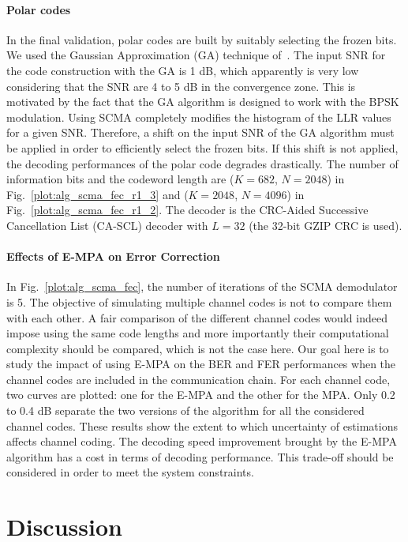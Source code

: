 \paragraph{Polar codes}

In the final validation, polar codes are built by suitably selecting the frozen
bits. We used the Gaussian Approximation (GA) technique of~\cite{Trifonov2012}.
The input SNR for the code construction with the GA is 1 dB, which apparently is
very low considering that the SNR are 4 to 5 dB in the convergence zone. This is
motivated by the fact that the GA algorithm is designed to work with the BPSK
modulation. Using SCMA completely modifies the histogram of the LLR values for a
given SNR. Therefore, a shift on the input SNR of the GA algorithm must be
applied in order to efficiently select the frozen bits. If this shift is
not applied, the decoding performances of the polar code degrades drastically.
The number of information bits and the codeword length are ($K=682$, $N=2048$)
in Fig.~\ref{plot:alg_scma_fec_r1_3} and ($K=2048$, $N=4096$) in
Fig.~\ref{plot:alg_scma_fec_r1_2}. The decoder is the CRC-Aided Successive
Cancellation List (CA-SCL) decoder with $L=32$ (the 32-bit GZIP CRC is used).

\paragraph{Effects of E-MPA on Error Correction}
\label{sec:alg_scma_fec_e-mpa}

In Fig.~\ref{plot:alg_scma_fec}, the number of iterations of the SCMA
demodulator is 5. The objective of simulating multiple channel codes is not to
compare them with each other. A fair comparison of the different channel codes
would indeed impose using the same code lengths and more importantly their
computational complexity should be compared, which is not the case here. Our
goal here is to study the impact of using E-MPA on the BER and FER performances
when the channel codes are included in the communication chain. For each channel
code, two curves are plotted: one for the E-MPA and the other for the MPA. Only
0.2 to 0.4 dB separate the two versions of the algorithm for all the considered
channel codes. These results show the extent to which uncertainty of estimations
affects channel coding. The decoding speed improvement brought by the E-MPA
algorithm has a cost in terms of decoding performance. This trade-off should be
considered in order to meet the system constraints.

\section{Discussion}

